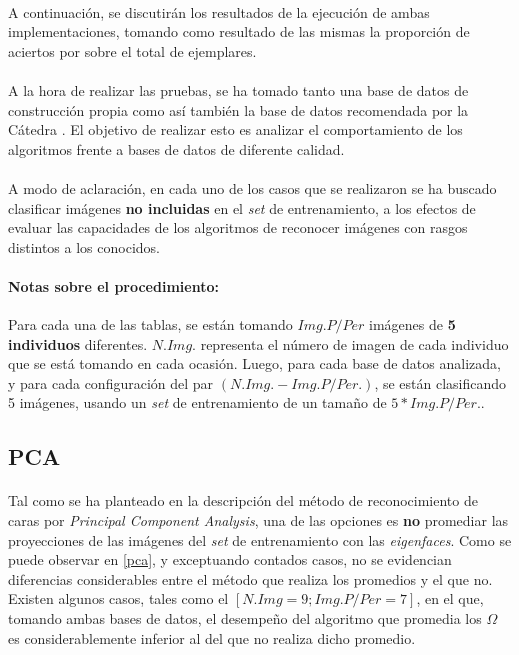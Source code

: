 \documentclass[12pt, twocolumn]{article}
\begin{document}
	\paragraph{} A continuación, se discutirán los resultados de la ejecución de ambas implementaciones, tomando como resultado de las mismas la proporción de aciertos por sobre el total de ejemplares. 
	
	\paragraph{} A la hora de realizar las pruebas, se ha tomado tanto una base de datos de construcción propia como así también la base de datos recomendada por la Cátedra \cite{dbf}. El objetivo de realizar esto es analizar el comportamiento de los algoritmos frente a bases de datos de diferente calidad. 
	
	\paragraph{} A modo de aclaración, en cada uno de los casos que se realizaron se ha buscado clasificar imágenes \textbf{no incluidas} en el \textit{set} de entrenamiento, a los efectos de evaluar las capacidades de los algoritmos de reconocer imágenes con rasgos distintos a los conocidos.
	
	\paragraph{Notas sobre el procedimiento:} Para cada una de las tablas, se están tomando $Img. P/Per$ imágenes de \textbf{5 individuos} diferentes. $N.Img.$ representa el número de imagen de cada individuo que se está tomando en cada ocasión. Luego, para cada base de datos analizada, y para cada configuración del par $(N. Img. - Img. P/Per.)$, se están clasificando 5 imágenes, usando un \textit{set} de entrenamiento de un tamaño de $5*Img. P/Per.$.
	
	
	\subsection{PCA}
	
	\paragraph{} Tal como se ha planteado en la descripción del método de reconocimiento de caras por \textit{Principal Component Analysis}, una de las opciones es \textbf{no} promediar las proyecciones de las imágenes del \textit{set} de entrenamiento con las \textit{eigenfaces}. Como se puede observar en \ref{pca}, y exceptuando contados casos, no se evidencian diferencias considerables entre el método que realiza los promedios y el que no. Existen algunos casos, tales como el $[N. Img = 9; Img. P/Per = 7]$, en el que, tomando ambas bases de datos, el desempeño del algoritmo que promedia los $\Omega$ es considerablemente inferior al del que no realiza dicho promedio. 
	
\end{document}
